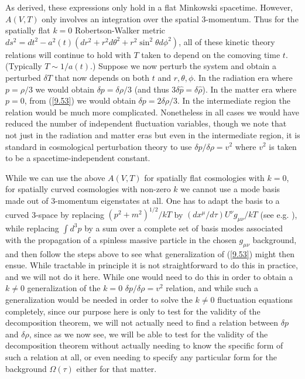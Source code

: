 \documentclass[aps,onecolumn,10pt]{revtex4}
\numberwithin{equation}{section}
\numberwithin{equation}{section}
\begin{document}
As derived, these expressions only hold in a flat  Minkowski spacetime. However, $A(V,T)$ only involves  an integration over the spatial 3-momentum. Thus for the spatially flat $k=0$ Robertson-Walker metric $ds^2=dt^2-a^2(t)(dr^2+r^2d\theta^2+r^2\sin^2\theta d\phi^2)$, all of these kinetic theory relations will continue to hold with $T$ taken to depend on the comoving time $t$. (Typically $T\sim 1/a(t)$.) Suppose we now perturb the system and obtain a perturbed $\delta T$ that now depends on both $t$ and $r,\theta,\phi$. In the radiation era where $p=\rho/3$ we would obtain $\delta p =\delta \rho/3$ (and thus $3\delta\hat{p}=\delta\hat{\rho}$). In the matter era where $p=0$, from (\ref{9.53}) we would obtain $\delta p=2\delta \rho/3$. In the intermediate region the relation would be much more complicated. Nonetheless in all cases we would have reduced the number of independent fluctuation variables, though we note that not just in the radiation and matter eras but even in the intermediate region, it is standard in cosmological perturbation theory to use $\delta p/\delta \rho=v^2$ where $v^2$ is taken to be a spacetime-independent constant.

While we can use the above $A(V,T)$ for spatially flat cosmologies with $k=0$, for spatially curved cosmologies with non-zero $k$ we cannot use a mode basis made out of 3-momentum eigenstates at all. One has to adapt the basis to a curved 3-space by replacing
$(p^2+m^2)^{1/2}/kT$ by $(dx^{\mu}/d\tau)U^{\nu}g_{\mu\nu}/kT$ (see e.g. \cite{Mannheim2006}), while replacing
$\int d^3p$ by a sum over a complete set of basis modes associated with
the propagation of a spinless massive particle in the chosen
$g_{\mu\nu}$ background, and then follow the steps above to see what
generalization of (\ref{9.53}) might then ensue. While tractable in principle it is not straightforward to do this in practice, and we will not do it here. While one would need to do this in order to obtain a $k\neq 0$ generalization of the $k=0$  $\delta p/\delta \rho=v^2$ relation, and while such a generalization would be needed in order to solve the $k\neq 0$ fluctuation equations completely, since our purpose here is only to test for the validity of the decomposition theorem, we will not actually need to find a relation between $\delta p$ and $\delta \rho$, since as we now see, we will be able to test for the validity of the decomposition theorem without actually needing to know the specific form of such a relation at all, or even needing to specify any particular form for the background $\Omega(\tau)$ either for that matter.
\end{document}
